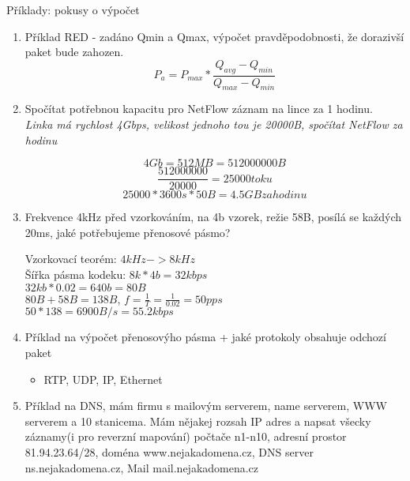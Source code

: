 \documentclass[12pt,a4paper,titlepage,final]{article}
\begin{document}
\newpage
{\LARGE Příklady: pokusy o výpočet}
\begin{enumerate}
	\item Příklad RED - zadáno Qmin a Qmax, výpočet pravděpodobnosti, že dorazivší paket bude zahozen.
	\[ 
		P_a = P_{max} * \frac{Q_{avg} - Q_{min}}{Q_{max} - Q_{min}}
	\]
	
	
	\item Spočítat potřebnou kapacitu pro NetFlow záznam na lince za 1 hodinu. \\
	\emph{Linka má rychlost 4Gbps, velikost jednoho tou je 20000B, spočítat NetFlow za hodinu}
	
	$$ 4Gb = 512 MB = 512 000 000 B  $$
	$$ \frac{512 000 000}{20 000} = 25 000 toku $$	
	$$ 25 000 * 3600s * 50B = 4.5 GB za hodinu $$ 
	


	\item Frekvence 4kHz před vzorkováním, na 4b vzorek, režie 58B, posílá se každých 20ms, jaké potřebujeme přenosové pásmo?
	
	Vzorkovací teorém: $4kHz -> 8kHz$ \\
	Šířka pásma kodeku: $8k * 4b = 32kbps$ \\
	$32kb * 0.02 = 640b = 80B$ \\
	$80B + 58B = 138B$, $f = \frac{1}{T} = \frac{1}{0.02} = 50 pps$ \\
	$50*138 = 6900 B/s = 55.2 kbps$
	

	\item Příklad na výpočet přenosovýho pásma + jaké protokoly obsahuje odchozí paket
	\begin{itemize}
		\item RTP, UDP, IP, Ethernet	
	\end{itemize}


	\item Příklad na DNS, mám firmu s mailovým serverem, name serverem, WWW serverem a 10 stanicema. Mám nějakej rozsah IP adres a napsat všecky záznamy(i pro reverzní mapování) počtače n1-n10, adresní prostor 81.94.23.64/28, doména www.nejakadomena.cz, DNS server ns.nejakadomena.cz, Mail mail.nejakadomena.cz


\end{enumerate}
\end{document}

